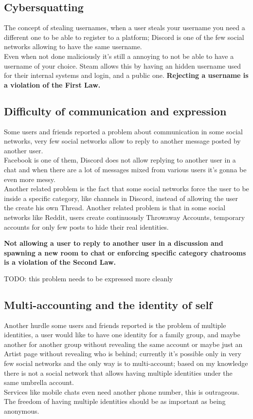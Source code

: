 \documentclass[12pt]{article}
\begin{document}
\subsection{Cybersquatting}

The concept of stealing usernames, when a user steals your username you need a different one to be able to register to a platform; Discord is one of the few social networks allowing to have the same username.\\
Even when not done maliciously it's still a annoying to not be able to have a username of your choice.
Steam allows this by having an hidden username used for their internal systems and login, and a public one.
\newline
\textbf{Rejecting a username is a violation of the First Law.}


\subsection{Difficulty of communication and expression}

Some users and friends reported a problem about communication in some social networks, very few social networks allow to reply to another message posted by another user. \\
Facebook is one of them, Discord does not allow replying to another user in a chat and when there are a lot of messages mixed from various users it's gonna be even more messy. \\
Another related problem is the fact that some social networks force the user to be inside a specific category, like channels in Discord, instead of allowing the user the create his own Thread.
Another related problem is that in some social networks like Reddit, users create continuously Throwaway Accounts, temporary accounts for only few posts to hide their real identities.

\textbf{Not allowing a user to reply to another user in a discussion and spawning a new room to chat or enforcing specific category chatrooms is a violation of the Second Law.}

TODO: this problem needs to be expressed more cleanly


\subsection{Multi-accounting and the identity of self}

Another hurdle some users and friends reported is the problem of multiple identities, a user would like to have one identity for a family group, and maybe another for another group without revealing the same account or maybe just an Artist page without revealing who is behind; currently it's possible only in very few social networks and the only way is to multi-account; based on my knowledge there is not a social network that allows having multiple identities under the same umbrella account. \\
Services like mobile chats even need another phone number, this is outrageous. 
The freedom of having multiple identities should be as important as being anonymous.
\end{document}

